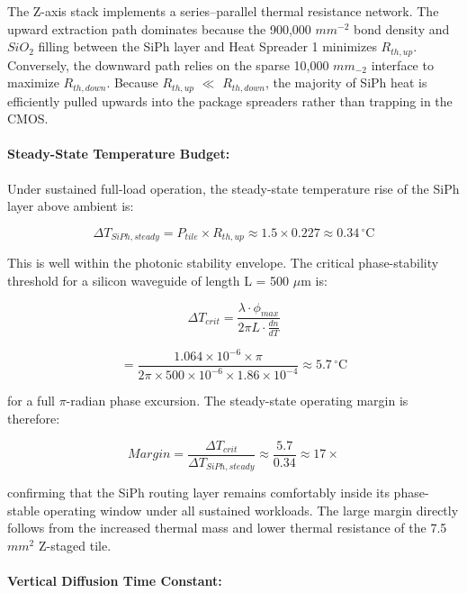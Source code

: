 \documentclass[journal]{IEEEtran}
\begin{document}
The Z-axis stack implements a series--parallel thermal resistance network. The upward extraction path dominates because the 900,000 $mm^{-2}$ bond density and $SiO_2$ filling between the SiPh layer and Heat Spreader 1 minimizes $R_{th,up}$. Conversely, the downward path relies on the sparse 10,000 $mm_{-2}$ interface to maximize $R_{th,down}$. Because $R_{th,up}$ $\ll$ $R_{th,down}$, the majority of SiPh heat is efficiently pulled upwards into the package spreaders rather than trapping in the CMOS.

\paragraph{\textbf{Steady-State Temperature Budget:}}

Under sustained full-load operation, the steady-state temperature rise of the SiPh layer above ambient is:

\begin{equation}
\Delta T_{SiPh,steady} = P_{tile} \times R_{th,up} \approx 1.5 \times 0.227 \approx 0.34 \,^{\circ}\mathrm{C}
\end{equation}

This is well within the photonic stability envelope. The critical phase-stability threshold for a silicon waveguide of length L = 500 $\mu$m is:

\begin{equation}
\Delta T_{crit} = \frac{\lambda \cdot \phi_{max}}{2\pi L \cdot \frac{dn}{dT}}
\end{equation}

\begin{equation}
= \frac{1.064 \times 10^{-6} \times \pi}{2\pi \times 500 \times 10^{-6} \times 1.86 \times 10^{-4}} \approx 5.7 \,^{\circ}\mathrm{C}
\end{equation}

for a full $\pi$-radian phase excursion. The steady-state operating margin is therefore:

\begin{equation}
Margin = \frac {\Delta T_{crit}}{\Delta T_{SiPh,steady}}
\approx \frac {5.7}{0.34} \approx 17\times
\end{equation}

confirming that the SiPh routing layer remains comfortably inside its phase-stable operating window under all sustained workloads. The large margin directly follows from the increased thermal mass and lower thermal resistance of the 7.5 $mm^{2}$ Z-staged tile.

\paragraph{\textbf{Vertical Diffusion Time Constant:}}
\end{document}
